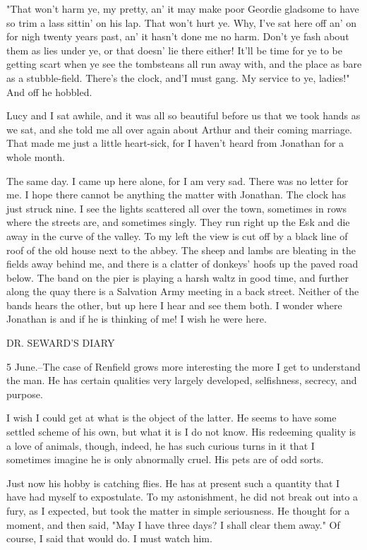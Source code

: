 "That won't harm ye, my pretty, an' it may make poor Geordie gladsome to have so trim a lass sittin' on his lap. That won't hurt ye. Why, I've sat here off an' on for nigh twenty years past, an' it hasn't done me no harm. Don't ye fash about them as lies under ye, or that doesn' lie there either! It'll be time for ye to be getting scart when ye see the tombsteans all run away with, and the place as bare as a stubble-field. There's the clock, and'I must gang. My service to ye, ladies!" And off he hobbled. 

Lucy and I sat awhile, and it was all so beautiful before us that we took hands as we sat, and she told me all over again about Arthur and their coming marriage. That made me just a little heart-sick, for I haven't heard from Jonathan for a whole month. 

The same day. I came up here alone, for I am very sad. There was no letter for me. I hope there cannot be anything the matter with Jonathan. The clock has just struck nine. I see the lights scattered all over the town, sometimes in rows where the streets are, and sometimes singly. They run right up the Esk and die away in the curve of the valley. To my left the view is cut off by a black line of roof of the old house next to the abbey. The sheep and lambs are bleating in the fields away behind me, and there is a clatter of donkeys' hoofs up the paved road below. The band on the pier is playing a harsh waltz in good time, and further along the quay there is a Salvation Army meeting in a back street. Neither of the bands hears the other, but up here I hear and see them both. I wonder where Jonathan is and if he is thinking of me! I wish he were here. 

DR. SEWARD'S DIARY 

5 June.--The case of Renfield grows more interesting the more I get to understand the man. He has certain qualities very largely developed, selfishness, secrecy, and purpose. 

I wish I could get at what is the object of the latter. He seems to have some settled scheme of his own, but what it is I do not know. His redeeming quality is a love of animals, though, indeed, he has such curious turns in it that I sometimes imagine he is only abnormally cruel. His pets are of odd sorts. 

Just now his hobby is catching flies. He has at present such a quantity that I have had myself to expostulate. To my astonishment, he did not break out into a fury, as I expected, but took the matter in simple seriousness. He thought for a moment, and then said, "May I have three days? I shall clear them away." Of course, I said that would do. I must watch him. 

